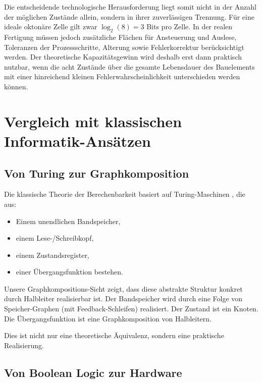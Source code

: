 \documentclass[12pt, a4paper]{article}
\theoremstyle{definition}
\theoremstyle{remark}
\begin{document}
Die entscheidende technologische Herausforderung liegt somit nicht in der
Anzahl der möglichen Zustände allein, sondern in ihrer zuverlässigen
Trennung. Für eine ideale oktonäre Zelle gilt zwar \(\log_2(8)=3\) Bits pro
Zelle. In der realen Fertigung müssen jedoch zusätzliche Flächen für
Ansteuerung und Auslese, Toleranzen der Prozessschritte, Alterung sowie
Fehlerkorrektur berücksichtigt werden. Der theoretische Kapazitätsgewinn wird
deshalb erst dann praktisch nutzbar, wenn die acht Zustände über die gesamte
Lebensdauer des Bauelements mit einer hinreichend kleinen Fehlerwahrscheinlichkeit
unterschieden werden können.

\section{Vergleich mit klassischen Informatik-Ansätzen}
\label{sec:klassische_ansaetze}

\subsection{Von Turing zur Graphkomposition}
\label{subsec:turing_zur_graph}

Die klassische Theorie der Berechenbarkeit basiert auf Turing-Maschinen \cite{turing1936}, die aus:
\begin{itemize}
  \item Einem unendlichen Bandspeicher,
  \item einem Lese-/Schreibkopf,
  \item einem Zustandsregister,
  \item einer Übergangsfunktion bestehen.
\end{itemize}

Unsere Graphkompositions-Sicht zeigt, dass diese abstrakte Struktur konkret durch Halbleiter realisierbar ist. Der Bandspeicher wird durch eine Folge von Speicher-Graphen (mit Feedback-Schleifen) realisiert. Der Zustand ist ein Knoten. Die Übergangsfunktion ist eine Graphkomposition von Halbleitern.

Dies ist nicht nur eine theoretische Äquivalenz, sondern eine praktische Realisierung.

\subsection{Von Boolean Logic zur Hardware}
\label{subsec:boolean_zu_hardware}
\end{document}
